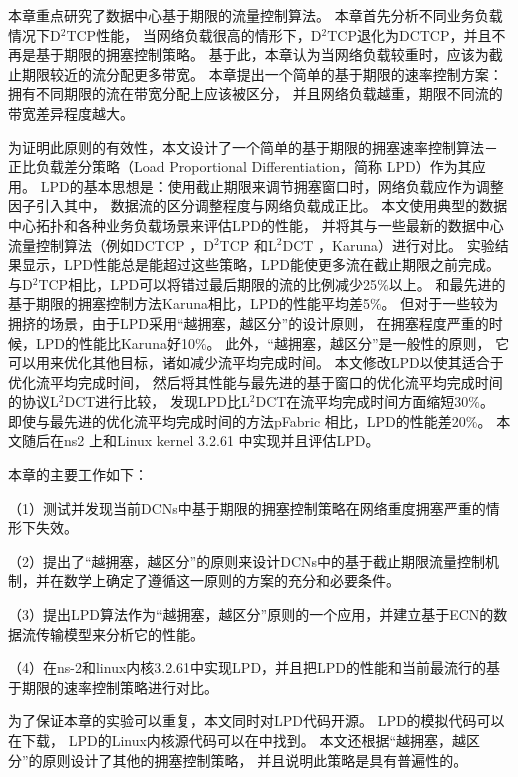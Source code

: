 本章重点研究了数据中心基于期限的流量控制算法。
本章首先分析不同业务负载情况下D$^2$TCP性能，
当网络负载很高的情形下，D$^2$TCP退化为DCTCP，并且不再是基于期限的拥塞控制策略。
基于此，本章认为当网络负载较重时，应该为截止期限较近的流分配更多带宽。
本章提出一个简单的基于期限的速率控制方案：
拥有不同期限的流在带宽分配上应该被区分，
并且网络负载越重，期限不同流的带宽差异程度越大。


为证明此原则的有效性，本文设计了一个简单的基于期限的拥塞速率控制算法－
正比负载差分策略（Load Proportional Differentiation，简称 LPD）作为其应用。 
LPD的基本思想是：使用截止期限来调节拥塞窗口时，网络负载应作为调整因子引入其中，
数据流的区分调整程度与网络负载成正比。
本文使用典型的数据中心拓扑和各种业务负载场景来评估LPD的性能，
并将其与一些最新的数据中心流量控制算法（例如DCTCP \cite{DCTCP} ，D$^2$TCP \cite{D2TCP}和L$^2$DCT \cite{L2DCT}，Karuna\cite{chen2016scheduling}）进行对比。
实验结果显示，LPD性能总是能超过这些策略，LPD能使更多流在截止期限之前完成。
与D$^2$TCP相比，LPD可以将错过最后期限的流的比例减少25$\%$以上。
和最先进的基于期限的拥塞控制方法Karuna相比，LPD的性能平均差5$\%$。
但对于一些较为拥挤的场景，由于LPD采用“越拥塞，越区分”的设计原则，
在拥塞程度严重的时候，LPD的性能比Karuna好10$\%$。
此外，“越拥塞，越区分”是一般性的原则，
它可以用来优化其他目标，诸如减少流平均完成时间。
本文修改LPD以使其适合于优化流平均完成时间，
然后将其性能与最先进的基于窗口的优化流平均完成时间的协议L$^2$DCT进行比较，
发现LPD比L$^2$DCT在流平均完成时间方面缩短30$\%$。
即使与最先进的优化流平均完成时间的方法pFabric \cite{pFabric}相比，LPD的性能差20$\%$。
本文随后在ns2 \cite{ns2,LPD-sim-code}上和Linux kernel 3.2.61 \cite{LPD-code}中实现并且评估LPD。

本章的主要工作如下：

（1）测试并发现当前DCNs中基于期限的拥塞控制策略在网络重度拥塞严重的情形下失效。

（2）提出了“越拥塞，越区分”的原则来设计DCNs中的基于截止期限流量控制机制，并在数学上确定了遵循这一原则的方案的充分和必要条件。
 
（3）提出LPD算法作为“越拥塞，越区分”原则的一个应用，并建立基于ECN的数据流传输模型来分析它的性能。
 
（4）在ns-2和linux内核3.2.61中实现LPD，并且把LPD的性能和当前最流行的基于期限的速率控制策略进行对比。
 
 
为了保证本章的实验可以重复，本文同时对LPD代码开源。
LPD的模拟代码可以在下载，
LPD的Linux内核源代码可以在中找到。
本文还根据“越拥塞，越区分”的原则设计了其他的拥塞控制策略，
并且说明此策略是具有普遍性的。
 
